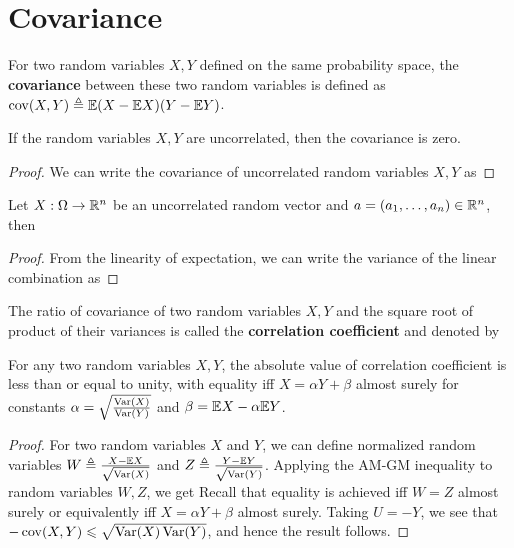 \documentclass[letterpaper,10pt,english]{article}
\begin{document}
\section{Covariance}
\begin{defn}[Covariance] 
For two random variables $X,Y$ defined on the same probability space, 
the \textbf{covariance} between these two random variables is defined as $\operatorname{cov}(X,Y) \triangleq \mathbb{E}(X-\mathbb{E} X)(Y-\mathbb{E} Y)$. 
\end{defn}
\begin{lem}
If the random variables $X,Y$ are uncorrelated, then the covariance is zero. 
\end{lem}
\begin{proof}
We can write the covariance of uncorrelated random variables $X, Y$ as 
\end{proof}
\begin{lem}
Let $X: \Omega \to \mathbb{R}^n$ be an uncorrelated random vector and $a = (a_1, \dots, a_n) \in \mathbb{R}^n$, then 
\end{lem}
\begin{proof}
From the linearity of expectation, we can write the variance of the linear combination as 
\end{proof}
\begin{defn} 
The ratio of covariance of two random variables $X,Y$ and the square root of product of their variances is called the \textbf{correlation coefficient} and denoted by
\end{defn}
\begin{thm} 
For any two random variables $X,Y$, the absolute value of correlation coefficient is less than or equal to unity, with equality iff $X = \alpha Y + \beta$ almost surely for constants $\alpha = \sqrt{\frac{\operatorname{Var}(X)}{\operatorname{Var}(Y)}}$ and $\beta = \mathbb{E} X - \alpha \mathbb{E} Y$. 
\end{thm}
\begin{proof} 
For two random variables $X$ and $Y$, we can define normalized random variables $W \triangleq \frac{X-\mathbb{E} X}{\sqrt{\operatorname{Var}(X)}}$ and $Z \triangleq \frac{Y-\mathbb{E} Y}{\sqrt{\operatorname{Var}(Y)}}$. 
Applying the AM-GM inequality to random variables $W, Z$, we get 
Recall that equality is achieved iff $W = Z$ almost surely or equivalently iff $X = \alpha Y + \beta$ almost surely.  
Taking $U = -Y$, we see that $-\operatorname{cov}(X,Y) \leqslant \sqrt{\operatorname{Var}(X)\operatorname{Var}(Y)}$, and hence the result follows.
\end{proof}
\end{document}
